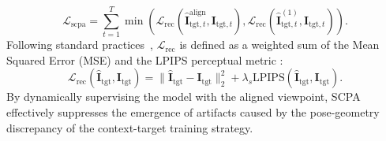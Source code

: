 \begin{equation}
    \mathcal{L}_{\text{scpa}} = \sum_{t=1}^{T} \min\left(\mathcal{L}_{\text{rec}}(\hat{\bm{I}}^{\text{align}}_{\text{tgt},t}, \bm{I}_{\text{tgt},t}), \mathcal{L}_{\text{rec}}(\hat{\bm{I}}^{(1)}_{\text{tgt},t}, \bm{I}_{\text{tgt},t}) \right).
\end{equation}
Following standard practices~\cite{xu2025depthsplat, chen2024mvsplat}, $\mathcal{L}_{\text{rec}}$ is defined as a weighted sum of the Mean Squared Error (MSE) and the LPIPS perceptual metric \cite{zhang2018perceptual}:
\begin{equation}
    \mathcal{L}_{\text{rec}}(\hat{\bm{I}}_{\text{tgt}}, \bm{I}_{\text{tgt}}) =  \| \hat{\bm{I}}_{\text{tgt}} - \bm{I}_{\text{tgt}} \|_2^2 + \lambda_{s} \text{LPIPS}(\hat{\bm{I}}_{\text{tgt}}, \bm{I}_{\text{tgt}}).
\end{equation}
By dynamically supervising the model with the aligned viewpoint, SCPA effectively suppresses the emergence of artifacts caused by the pose-geometry discrepancy of the context-target training strategy.



